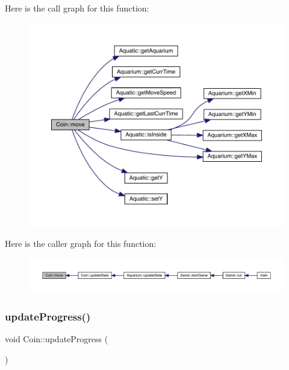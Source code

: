 Here is the call graph for this function\+:\nopagebreak
\begin{figure}[H]
\begin{center}
\leavevmode
\includegraphics[width=350pt]{class_coin_ab62bca5834489b9b483deaa3ca3470e9_cgraph}
\end{center}
\end{figure}
Here is the caller graph for this function\+:\nopagebreak
\begin{figure}[H]
\begin{center}
\leavevmode
\includegraphics[width=350pt]{class_coin_ab62bca5834489b9b483deaa3ca3470e9_icgraph}
\end{center}
\end{figure}
\mbox{\label{class_coin_ac54d7b690f7e415d2220711f718f638e}} 
\subsubsection{\texorpdfstring{update\+Progress()}{updateProgress()}}
{\footnotesize\ttfamily void Coin\+::update\+Progress (\begin{DoxyParamCaption}{ }\end{DoxyParamCaption})\hspace{0.3cm}{\ttfamily [virtual]}}



